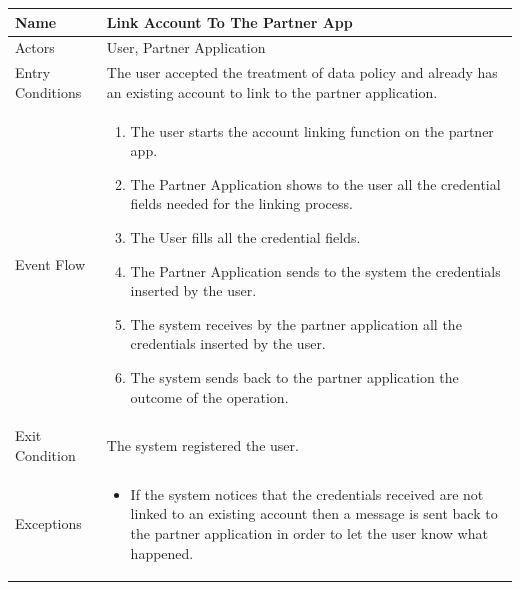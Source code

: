 \begin{enumerate}
\FloatBarrier
\begin{table}[h]
\begin{tabular}{|l|p{}|}
\hline
Name             & Link Account To The Partner App\\ \hline
Actors           & User, Partner Application  \\ \hline
Entry Conditions & The user accepted the treatment of data policy and already has an existing account to link to the partner application.  \\ \hline
Event Flow       & \begin{enumerate}
			\item The user starts the account linking function on the partner app.
			\item The Partner Application shows to the user all the credential fields needed for the linking process.
            \item The User fills all the credential fields.
            \item The Partner Application sends to the system the credentials inserted by the user.
            \item The system receives by the partner application all the credentials inserted by the user.
            \item The system sends back to the partner application the outcome of the operation. 
        \end{enumerate}\\ \hline
Exit Condition   & The system registered the user.\\ \hline
Exceptions       & \begin{itemize}
\item If the system notices that the credentials received are not linked to an existing account then a message is sent back to the partner application in order to let the user know what happened.
\end{itemize}\\ \hline
\end{tabular}
\end{table}
\FloatBarrier



\end{enumerate}
